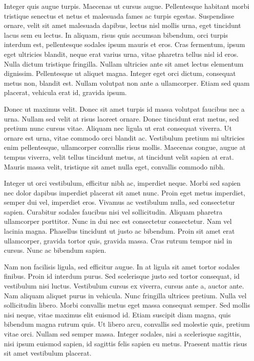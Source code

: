 Integer quis augue turpis. Maecenas ut cursus augue. Pellentesque habitant morbi tristique senectus et netus et malesuada fames ac turpis egestas. Suspendisse ornare, velit sit amet malesuada dapibus, lectus nisl mollis urna, eget tincidunt lacus sem eu lectus. In aliquam, risus quis accumsan bibendum, orci turpis interdum est, pellentesque sodales ipsum mauris et eros. Cras fermentum, ipsum eget ultricies blandit, neque erat varius urna, vitae pharetra tellus nisl id eros. Nulla dictum tristique fringilla. Nullam ultricies ante sit amet lectus elementum dignissim. Pellentesque ut aliquet magna. Integer eget orci dictum, consequat metus non, blandit est. Nullam volutpat non ante a ullamcorper. Etiam sed quam placerat, vehicula erat id, gravida ipsum.

Donec ut maximus velit. Donec sit amet turpis id massa volutpat faucibus nec a urna. Nullam sed velit at risus laoreet ornare. Donec tincidunt erat metus, sed pretium nunc cursus vitae. Aliquam nec ligula ut erat consequat viverra. Ut ornare est urna, vitae commodo orci blandit ac. Vestibulum pretium mi ultricies enim pellentesque, ullamcorper convallis risus mollis. Maecenas congue, augue at tempus viverra, velit tellus tincidunt metus, at tincidunt velit sapien at erat. Mauris massa velit, tristique sit amet nulla eget, convallis commodo nibh.

Integer ut orci vestibulum, efficitur nibh ac, imperdiet neque. Morbi sed sapien nec dolor dapibus imperdiet placerat sit amet nunc. Proin eget metus imperdiet, semper dui vel, imperdiet eros. Vivamus ac vestibulum nulla, sed consectetur sapien. Curabitur sodales faucibus nisi vel sollicitudin. Aliquam pharetra ullamcorper porttitor. Nunc in dui nec est consectetur consectetur. Nam vel lacinia magna. Phasellus tincidunt ut justo ac bibendum. Proin sit amet erat ullamcorper, gravida tortor quis, gravida massa. Cras rutrum tempor nisl in cursus. Nunc ac bibendum sapien.

Nam non facilisis ligula, sed efficitur augue. In at ligula sit amet tortor sodales finibus. Proin id interdum purus. Sed scelerisque justo sed tortor consequat, id vestibulum nisi luctus. Vestibulum cursus ex viverra, cursus ante a, auctor ante. Nam aliquam aliquet purus in vehicula. Nunc fringilla ultrices pretium. Nulla vel sollicitudin libero. Morbi convallis metus eget massa consequat semper. Sed mollis nisi neque, vitae maximus elit euismod id. Etiam suscipit diam magna, quis bibendum magna rutrum quis. Ut libero arcu, convallis sed molestie quis, pretium vitae orci. Nullam sed semper massa. Integer sodales, nisi a scelerisque sagittis, nisi ipsum euismod sapien, id sagittis felis sapien eu metus. Praesent mattis risus sit amet vestibulum placerat.

